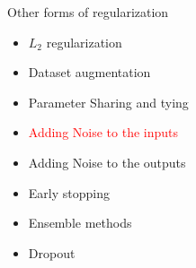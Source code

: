 \begin{frame}
\end{frame}

\begin{frame}
	\vspace{4em}
	\begin{overlayarea}{\textwidth}{\textheight}
		\begin{block}{Other forms of regularization}
			\begin{itemize}
				\item $L_2$ regularization
				\item Dataset augmentation
				\item Parameter Sharing and tying
				\item \textcolor<2->{red}{Adding Noise to the inputs }
				\item Adding Noise to the outputs 
				\item Early stopping
				\item Ensemble methods
				\item Dropout
			\end{itemize}
		\end{block}
	\end{overlayarea}
\end{frame}
			

